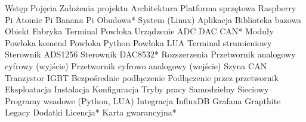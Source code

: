 Wstęp
    Pojęcia
    Założenia projektu
Architektura
    Platforma sprzętowa
        Raspberry Pi
        Atomic Pi
        Banana Pi
        Obudowa*
    System (Linux)
    Aplikacja
        Biblioteka bazowa
            Obiekt
                Fabryka
                Terminal
                Powłoka
                Urządzenie
                    ADC
                    DAC
                    CAN*
        Moduły
            Powłoka komend
            Powłoka Python
            Powłoka LUA
            Terminal strumieniowy
            Sterownik ADS1256
            Sterownik DAC8532*
Rozszerzenia
    Przetwornik analogowy cyfrowy (wyjście)
    Przetwornik cyfrowo analogowy (wejście)
    Szyna CAN
    Tranzystor IGBT
        Bezpośrednie podłączenie
        Podłączenie przez przetwornik
Eksploatacja
    Instalacja
    Konfiguracja
        Tryby pracy
            Samodzielny
            Sieciowy
        Programy wsadowe (Python, LUA)
    Integracja
        InfluxDB
        Grafana
        Grapthite
        Legacy
Dodatki
    Licencja*
    Karta gwarancyjna*
